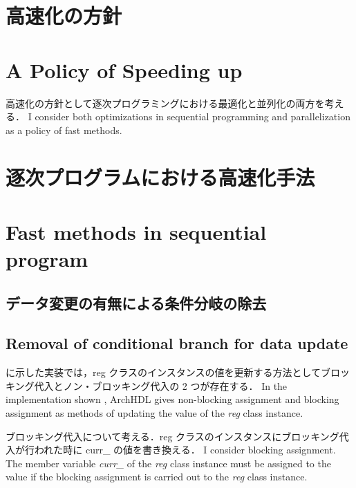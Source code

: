 \section{高速化の方針}
\fi
\section{A Policy of Speeding up}

高速化の方針として逐次プログラミングにおける最適化と並列化の両方を考える．
\fi
I consider both optimizations in sequential programming and parallelization
as a policy of fast methods.

\section{逐次プログラムにおける高速化手法}
\fi
\section{Fast methods in sequential program}

\subsection{データ変更の有無による条件分岐の除去 \label{sss:no_set}}
\fi
\subsection{Removal of conditional branch for data update} \label{sss:no_set}


 に示した実装では，reg クラスのインスタンスの値を更新する方法としてブロッキング代入とノン・ブロッキング代入の 2 つが存在する．
\fi
In the implementation shown ,
ArchHDL gives non-blocking assignment and blocking assignment as methods of updating the value of the \textit{reg} class instance.

ブロッキング代入について考える．reg クラスのインスタンスにブロッキング代入が行われた時に curr\_ の値を書き換える．
\fi
I consider blocking assignment.
The member variable \textit{curr\_} of the \textit{reg} class instance must be assigned to the value
if the blocking assignment is carried out to the \textit{reg} class instance.

